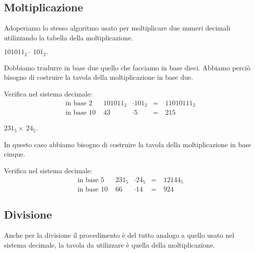 \ovalbox{\risolvii \ref{ese:4.24}, \ref{ese:4.25}, \ref{ese:4.26}}
\pagebreak
\subsection{Moltiplicazione}

Adoperiamo lo stesso algoritmo usato per moltiplicare due numeri
decimali utilizzando la tabella della moltiplicazione.

\begin{exrig}

\begin{esempio}
$101011_{2}\cdot~101_{2}.$

Dobbiamo tradurre in base due quello che facciamo in base dieci. Abbiamo
perciò bisogno di costruire la tavola della moltiplicazione in base
due.
\begin{center}

\end{center}
Verifica nel sistema decimale: %
\begin{align*}
&\text{in base 2 }&101011_{2}&\cdot 101_{2}&=&~11010111_{2}\\
&\text{in base 10 }&43&\cdot 5&=&~215
\end{align*}
 \end{esempio}
 \begin{esempio}
 $231_{5}\times~24_{5}$.

In questo caso abbiamo bisogno di costruire la tavola della moltiplicazione in base
cinque.

\begin{center}
 
\end{center}
 Verifica nel sistema decimale: %
\begin{align*}
&\text{in base 5 }&231_{5}&\cdot 24_{5}&=&~12144_{5}\\
&\text{in base 10 }&66&\cdot 14&=&~924
\end{align*}
 \end{esempio}
\end{exrig}

\ovalbox{\risolvii \ref{ese:4.27}, \ref{ese:4.28}, \ref{ese:4.29}}
\pagebreak
\subsection{Divisione}

Anche per la divisione il procedimento è del tutto analogo a quello
usato nel sistema decimale, la tavola da utilizzare è quella della
moltiplicazione.


